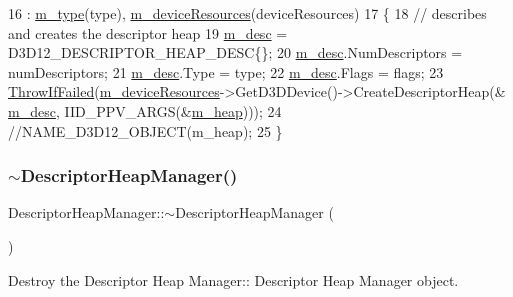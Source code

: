 \begin{DoxyCode}
16                                                                                               : 
      \mbox{\hyperlink{class_descriptor_heap_manager_a97dc1db0ffbcb980be70180fdd3e97dd}{m\_type}}(type), \mbox{\hyperlink{class_descriptor_heap_manager_a6a5e1513f7c9b6ba048796882e16de01}{m\_deviceResources}}(deviceResources)
17 \{
18     \textcolor{comment}{// describes and creates the descriptor heap}
19     \mbox{\hyperlink{class_descriptor_heap_manager_a09cfe4f8f94bb9d12b441132fb53a95e}{m\_desc}} = D3D12\_DESCRIPTOR\_HEAP\_DESC\{\};
20     \mbox{\hyperlink{class_descriptor_heap_manager_a09cfe4f8f94bb9d12b441132fb53a95e}{m\_desc}}.NumDescriptors = numDescriptors;
21     \mbox{\hyperlink{class_descriptor_heap_manager_a09cfe4f8f94bb9d12b441132fb53a95e}{m\_desc}}.Type = type;
22     \mbox{\hyperlink{class_descriptor_heap_manager_a09cfe4f8f94bb9d12b441132fb53a95e}{m\_desc}}.Flags = flags;
23     \mbox{\hyperlink{_direct_x_helper_8h_abca3eeca6b5772a1112e0a9a9e3d9013}{ThrowIfFailed}}(\mbox{\hyperlink{class_descriptor_heap_manager_a6a5e1513f7c9b6ba048796882e16de01}{m\_deviceResources}}->GetD3DDevice()->CreateDescriptorHeap(&
      \mbox{\hyperlink{class_descriptor_heap_manager_a09cfe4f8f94bb9d12b441132fb53a95e}{m\_desc}}, IID\_PPV\_ARGS(&\mbox{\hyperlink{class_descriptor_heap_manager_a373ccb68b5f147346d24469f8b46e2f4}{m\_heap}})));
24     \textcolor{comment}{//NAME\_D3D12\_OBJECT(m\_heap);}
25 \}
\end{DoxyCode}
\mbox{\label{class_descriptor_heap_manager_afb06cc02997f44f9e6d651d229358dd2}} 
\subsubsection{\texorpdfstring{$\sim$\+Descriptor\+Heap\+Manager()}{~DescriptorHeapManager()}}
{\footnotesize\ttfamily Descriptor\+Heap\+Manager\+::$\sim$\+Descriptor\+Heap\+Manager (\begin{DoxyParamCaption}{ }\end{DoxyParamCaption})}



Destroy the Descriptor Heap Manager\+:\+: Descriptor Heap Manager object. 



